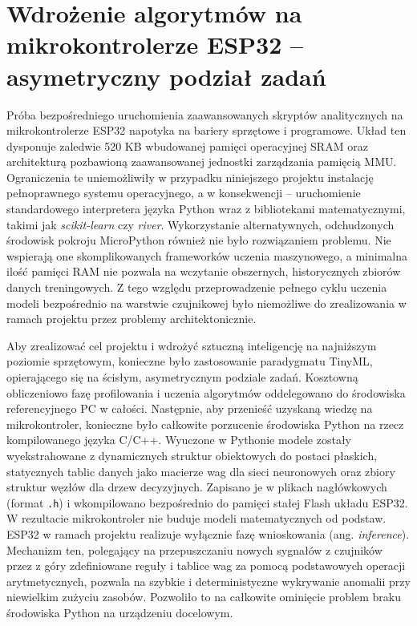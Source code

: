 \documentclass[12pt,twoside]{article}
\begin{document}
\section{Wdrożenie algorytmów na mikrokontrolerze ESP32 – asymetryczny podział zadań}
Próba bezpośredniego uruchomienia zaawansowanych skryptów analitycznych na mikrokontrolerze ESP32 napotyka na bariery sprzętowe i programowe. Układ ten dysponuje zaledwie 520 KB wbudowanej pamięci operacyjnej SRAM oraz architekturą pozbawioną zaawansowanej jednostki zarządzania pamięcią MMU. Ograniczenia te uniemożliwiły w przypadku niniejszego projektu instalację pełnoprawnego systemu operacyjnego, a w konsekwencji – uruchomienie standardowego interpretera języka Python wraz z bibliotekami matematycznymi, takimi jak \textit{scikit-learn} czy \textit{river}. Wykorzystanie alternatywnych, odchudzonych środowisk pokroju MicroPython również nie było rozwiązaniem problemu. Nie wspierają one skomplikowanych frameworków uczenia maszynowego, a minimalna ilość pamięci RAM nie pozwala na wczytanie obszernych, historycznych zbiorów danych treningowych. Z tego względu przeprowadzenie pełnego cyklu uczenia modeli bezpośrednio na warstwie czujnikowej było niemożliwe do zrealizowania w ramach projektu przez problemy architektonicznie.

Aby zrealizować cel projektu i wdrożyć sztuczną inteligencję na najniższym poziomie sprzętowym, konieczne było zastosowanie paradygmatu TinyML, opierającego się na ścisłym, asymetrycznym podziale zadań. Kosztowną obliczeniowo fazę profilowania i uczenia algorytmów oddelegowano do środowiska referencyjnego PC w całości. Następnie, aby przenieść uzyskaną wiedzę na mikrokontroler, konieczne było całkowite porzucenie środowiska Python na rzecz kompilowanego języka C/C++. Wyuczone w Pythonie modele zostały wyekstrahowane z dynamicznych struktur obiektowych do postaci płaskich, statycznych tablic danych jako macierze wag dla sieci neuronowych oraz zbiory struktur węzłów dla drzew decyzyjnych. Zapisano je w plikach nagłówkowych (format \texttt{.h}) i wkompilowano bezpośrednio do pamięci stałej Flash układu ESP32. W rezultacie mikrokontroler nie buduje modeli matematycznych od podstaw. ESP32 w ramach projektu realizuje wyłącznie fazę wnioskowania (ang. \textit{inference}). Mechanizm ten, polegający na przepuszczaniu nowych sygnałów z czujników przez z góry zdefiniowane reguły i tablice wag za pomocą podstawowych operacji arytmetycznych, pozwala na szybkie i deterministyczne wykrywanie anomalii przy niewielkim zużyciu zasobów. Pozwoliło to na całkowite ominięcie problem braku środowiska Python na urządzeniu docelowym.
\end{document}

